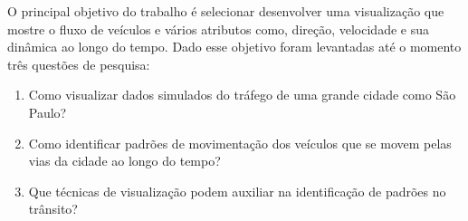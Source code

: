 O principal objetivo do trabalho é selecionar desenvolver uma visualização que
mostre o fluxo de veículos e vários atributos como, direção, velocidade e sua
dinâmica ao longo do tempo. Dado esse objetivo foram levantadas até
o momento três questões de pesquisa:

\begin{enumerate} 
  \item Como visualizar dados simulados do tráfego de uma grande cidade como
São Paulo?

  \item Como identificar padrões de movimentação dos veículos que se movem
pelas vias da cidade ao longo do tempo?
        
  \item Que técnicas de visualização podem auxiliar na identificação de padrões
no trânsito?
\end{enumerate}

%
